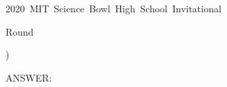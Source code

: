 \documentclass[12pt]{article}
\begin{document}
\begin{center}
  \begin{LARGE}
    {\selectfont
      \mbox{2020 MIT Science Bowl High School Invitational}
      \par Round \roundnumber
    }
  \end{LARGE}
\end{center}

{
  \ifodd\thecsvrow\filbreak\fi

  \begin{center}
    {\textbf{\MakeUppercase{\tb}}}
  \end{center}

  )  \MakeUppercase{\cat} \textit{\mcsa} \question

  \vspace{5pt}
  ANSWER: \answer \vspace{15pt}

  \unless\ifodd\thecsvrow\hrulefill\fi
}
\end{document}
